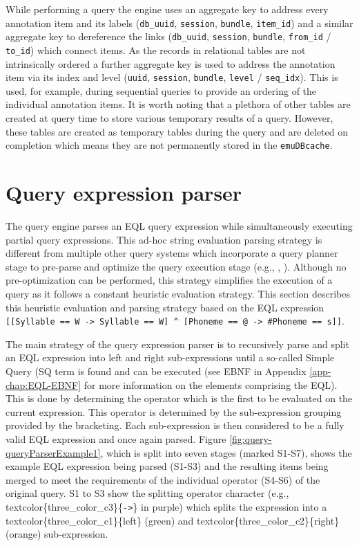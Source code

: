 \documentclass[]{book}
\begin{document}
While performing a query the engine uses an aggregate key to address every annotation item and its labels (\texttt{db\_uuid}, \texttt{session}, \texttt{bundle}, \texttt{item\_id}) and a similar aggregate key to dereference the links (\texttt{db\_uuid}, \texttt{session}, \texttt{bundle}, \texttt{from\_id} / \texttt{to\_id}) which connect items. As the records in relational tables are not intrinsically ordered a further aggregate key is used to address the annotation item via its index and level (\texttt{uuid}, \texttt{session}, \texttt{bundle}, \texttt{level} / \texttt{seq\_idx}). This is used, for example, during sequential queries to provide an ordering of the individual annotation items. It is worth noting that a plethora of other tables are created at query time to store various temporary results of a query. However, these tables are created as temporary tables during the query and are deleted on completion which means they are not permanently stored in the \texttt{emuDBcache}.

\hypertarget{sec:query-queryExpressionParser}{%
\section{Query expression parser}\label{sec:query-queryExpressionParser}}

The query engine parses an EQL query expression while simultaneously executing partial query expressions. This ad-hoc string evaluation parsing strategy is different from multiple other query systems which incorporate a query planner stage to pre-parse and optimize the query execution stage (e.g., \citet{hipp:2007a}, \citet{conway:2016a}). Although no pre-optimization can be performed, this strategy simplifies the execution of a query as it follows a constant heuristic evaluation strategy. This section describes this heuristic evaluation and parsing strategy based on the EQL expression \texttt{{[}{[}Syllable\ ==\ W\ -\textgreater{}\ Syllable\ ==\ W{]}\ \^{}\ {[}Phoneme\ ==\ @\ -\textgreater{}\ \#Phoneme\ ==\ s{]}{]}}.

The main strategy of the query expression parser is to recursively parse and split an EQL expression into left and right sub-expressions until a so-called Simple Query (SQ term is found and can be executed (see EBNF in Appendix \ref{app-chap:EQL-EBNF} for more information on the elements comprising the EQL). This is done by determining the operator which is the first to be evaluated on the current expression. This operator is determined by the sub-expression grouping provided by the bracketing. Each sub-expression is then considered to be a fully valid EQL expression and once again parsed. Figure \ref{fig:query-queryParserExample1}, which is split into seven stages (marked S1-S7), shows the example EQL expression being parsed (S1-S3) and the resulting items being merged to meet the requirements of the individual operator (S4-S6) of the original query. S1 to S3 show the splitting operator character (e.g., textcolor\{three\_color\_c3\}\{\texttt{-\textgreater{}}\} in purple) which splits the expression into a textcolor\{three\_color\_c1\}\{left\} (green) and textcolor\{three\_color\_c2\}\{right\} (orange) sub-expression.
\end{document}
